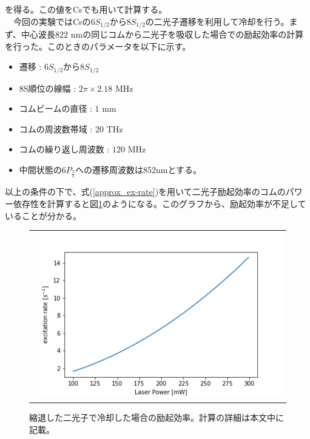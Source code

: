 \documentclass[uplatex, dvipdfmx, a4paper, report, papersize, 11pt]{jsbook}
\begin{document}
を得る。この値をCsでも用いて計算する。\\
　今回の実験ではCsの$6S_{1/2}$から$8S_{1/2}$の二光子遷移を利用して冷却を行う。まず、中心波長$822$ nmの同じコムから二光子を吸収した場合での励起効率の計算を行った。このときのパラメータを以下に示す。
\begin{itemize}
  \item 遷移 : $6S_{1/2}$から$8S_{1/2}$
  \item 8S順位の線幅 : $2\pi \times 2.18$ MHz
  \item コムビームの直径 : $1$ mm
  \item コムの周波数帯域 : $20$ THz
  \item コムの繰り返し周波数 : $120$ MHz
  \item 中間状態の$6P_{\frac{3}{2}}$への遷移周波数は852nmとする。
\end{itemize}
以上の条件の下で、式(\ref{approx_ex-rate})を用いて二光子励起効率のコムのパワー依存性を計算すると図\ref{degenerated_2_photon_excitation_rate-P}のようになる。このグラフから、励起効率が不足していることが分かる。\\
\begin{figure}[htpb]
  \centering
    \begin{tabular}{c}
      \begin{minipage}{1\hsize}
        \centering
          \includegraphics[keepaspectratio,  scale=0.6,  angle=0]
                          {figures/chapter3/degenerated_2_photon_excitation_rate-P.png}
                          \caption{縮退した二光子で冷却した場合の励起効率。計算の詳細は本文中に記載。}
                          \label{degenerated_2_photon_excitation_rate-P}
      \end{minipage}
    \end{tabular}
\end{figure}
\end{document}
